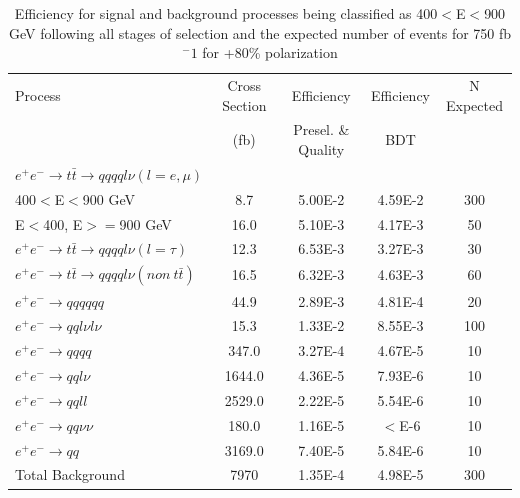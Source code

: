 \begin{table}
  \centering
  \begin{tabular}{l | c | c | c | c}
    \toprule
    Process     & Cross Section & Efficiency & Efficiency & N Expected\\
         & (fb) & Presel. \& Quality & BDT & \\
    \midrule
    $e^+e^-\rightarrow t\bar{t} \rightarrow qqqql\nu (l=e,\mu)$ &  & \\
    400$<$E$<$900 GeV & 8.7 & 5.00E-2 & 4.59E-2 & 300\\
    E$<$400, E$>=$900 GeV & 16.0 & 5.10E-3 & 4.17E-3 & 50\\
   \midrule
    $e^+e^-\rightarrow t\bar{t} \rightarrow qqqql\nu (l=\tau)$& 12.3 & 6.53E-3 & 3.27E-3 & 30\\
    \midrule
    $e^+e^-\rightarrow t\bar{t} \rightarrow qqqql\nu (non ~ t\bar{t})$& 16.5 & 6.32E-3 & 4.63E-3 & 60\\
    \midrule
    $e^+e^-\rightarrow qqqqqq$ & 44.9 & 2.89E-3 & 4.81E-4 & 20 \\
    \midrule
    $e^+e^-\rightarrow qql\nu l\nu$ & 15.3  & 1.33E-2 & 8.55E-3 & 100 \\
    \midrule
    $e^+e^-\rightarrow qqqq$ & 347.0 & 3.27E-4 & 4.67E-5 & 10 \\
    \midrule
    $e^+e^-\rightarrow qql\nu$ & 1644.0 & 4.36E-5 & 7.93E-6 & 10\\
    \midrule
    $e^+e^-\rightarrow qqll$ & 2529.0 & 2.22E-5 & 5.54E-6 & 10 \\
    \midrule
    $e^+e^-\rightarrow qq\nu\nu$ & 180.0 & 1.16E-5 & $<$E-6 & 10 \\
    \midrule
    $e^+e^-\rightarrow qq$ & 3169.0 & 7.40E-5 & 5.84E-6 & 10 \\
    \midrule
    \midrule
    Total Background & 7970 & 1.35E-4 & 4.98E-5 & 300\\
    \bottomrule
  \end{tabular}
  \caption{Efficiency for signal and background processes being classified as 400$<$E$<$900 GeV following all stages of selection and the expected number of events for 750 fb$^-1$ for +80\% polarization}
  \label{table:topfinalefficienciesposLowE}
\end{table}


